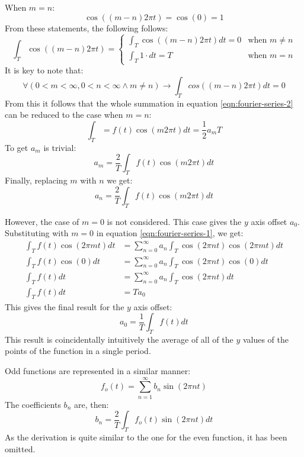 \documentclass{article}
\begin{document}
When $m = n$:
$$\cos( (m - n) 2 \pi t) = \cos(0) = 1$$
From these statements, the following follows:
\[
	\int_{T} \cos( (m - n) 2 \pi t) = 
	\begin{cases}
		\int_{T} \cos ( (m -n) 2 \pi t) dt = 0 & \text{when } m \neq n \\
		\int_{T} 1 \cdot dt = T & \text{when } m = n
	\end{cases}
\]
It is key to note that:
$$\forall (0 < m < \infty, 0 < n < \infty \land m \neq n) \rightarrow
\int_{T} cos( (m - n) 2 \pi t) dt = 0$$
From this it follows that the whole summation in equation 
\ref{eqn:fourier-series-2} can be reduced to the case when $m = n$:
$$\int_T = f(t) \cos(m 2 \pi t) dt = \frac{1}{2} a_m T$$
To get $a_m$ is trivial:
\begin{equation*}
	a_m = \frac{2}{T} \int_T f(t) \cos(m 2 \pi t) dt
\end{equation*}
Finally, replacing $m$ with $n$ we get:
\begin{equation}
	a_n = \frac{2}{T} \int_T f(t) \cos(m 2 \pi t) dt
	\label{eqn:fourier-series-amp}
\end{equation}

However, the case of $m = 0$ is not considered. This case gives the $y$ axis 
offset $a_0$. Substituting with $m = 0$ in equation \ref{eqn:fourier-series-1}, 
we get:
$$
\begin{aligned}
\int_{T} f(t) \cos(2 \pi m t) dt &= 
\sum^{\infty}_{n=0} a_n \int_{T} \cos(2 \pi n t) \cos(2 \pi m t) dt \\ 
\int_T f(t) \cos(0) dt &= \sum^{\infty}_{n=0} a_n \int_T \cos(2 \pi n t) \cos(0) dt \\
\int_T f(t) dt &= \sum^{\infty}_{n=0} a_n \int_T \cos(2 \pi n t) dt \\
\int_T f(t) dt &= T a_0
\end{aligned}$$
This gives the final result for the $y$ axis offset:
\begin{equation}
	a_0 = \frac{1}{T} \int_T f(t) dt
	\label{eqn:fourier-series-yoffset}
\end{equation}
This result is coincidentally intuitively the average of all of the $y$ values 
of the points of the function in a single period.

Odd functions are represented in a similar manner:
$$f_o(t) = \sum^{\infty}_{n=1} b_n \sin(2 \pi n t)$$
The coefficients $b_n$ are, then:
$$b_n = \frac{2}{T}\int_T f_o(t) \sin(2 \pi n t) dt$$
As the derivation is quite similar to the one for the even function, it has 
been omitted.
\end{document}

